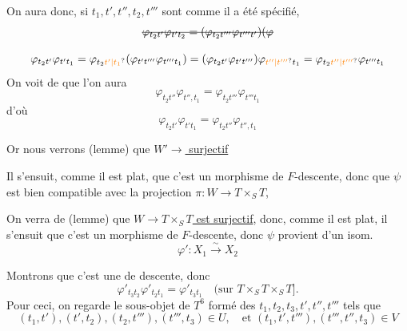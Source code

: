 
On aura donc, si $t_1,t',t'',t_2,t'''$ sont comme il a été spécifié,
\[
\deleted{\varphi_{t_2t'}\varphi_{t't_{2}}=(\varphi_{t_2t'''}\varphi_{t'''t'})(\varphi}
\]

\[
\varphi_{t_2t'}\varphi_{t't_1}=\varphi_{t_2\unsure{t'|t_1}}(\varphi_{t't'''}\varphi_{t'''t_1})=(\varphi_{t_2t'}\varphi_{t't'''})\varphi_{\unsure{t''|t'''}t_1}=\varphi_{t_2\unsure{t''|t'''}}\varphi_{t'''t_1}
\]
On voit de  que l'on aura
\[
\varphi_{t_2t''}\varphi_{t'',t_1}=\varphi_{t_2t'''}\varphi_{t'''t_1}
\]
d'où 
\[
\varphi_{t_2t'}\varphi_{t't_1}=\varphi_{t_2t''}\varphi_{t'',t_1}
\]

Or nous verrons (lemme) que \uline{$W'\to$   surjectif}

Il s'ensuit, comme il est plat, que c'est un morphisme de $F$-descente, donc que $\psi$ est bien compatible avec la projection $\pi:W\to T\times_S T$,

On verra de  (lemme) que \uline{$W\to T\times_S T$ est surjectif}, donc, comme il est plat, il s'ensuit que c'est un morphisme de $F$-descente, donc $\psi$ provient d'un isom.
\[
\varphi':X_1\xrightarrow{\sim}X_2
\]

Montrons que c'est une   de descente, donc
\[
\varphi'_{t_3t_2}\varphi'_{t_2t_1}=\varphi'_{t_3t_1}\quad (\text{sur }T\times_S T\times_S T].
\]
Pour ceci, on regarde le  sous-objet   de $T^6$ formé des $t_1,t_2,t_3,t',t'',t'''$ tels que
\[
(t_1,t'),(t',t_2),(t_2,t'''),(t''',t_3)\in U,\quad\text{et }(t_1,t',t'''),(t''',t'',t_3)\in V
\]


